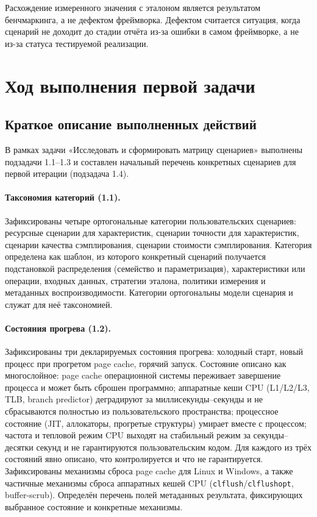 \documentclass[12pt,a4paper]{article}
\begin{document}
Расхождение измеренного значения с эталоном является результатом
бенчмаркинга, а не дефектом фреймворка. Дефектом считается ситуация,
когда сценарий не доходит до стадии отчёта из-за ошибки в самом
фреймворке, а не из-за статуса тестируемой реализации.
\newpage

\section{Ход выполнения первой задачи}
\label{sec:task1}

\subsection{Краткое описание выполненных действий}

В рамках задачи «Исследовать и сформировать матрицу сценариев»
выполнены подзадачи 1.1--1.3 и составлен начальный перечень
конкретных сценариев для первой итерации (подзадача 1.4).

\paragraph{Таксономия категорий (1.1).}
Зафиксированы четыре ортогональные категории пользовательских
сценариев: ресурсные сценарии для характеристик, сценарии
точности для характеристик, сценарии качества сэмплирования,
сценарии стоимости сэмплирования. Категория определена как
шаблон, из которого конкретный сценарий получается подстановкой
распределения (семейство и параметризация), характеристики
или операции, входных данных, стратегии эталона, политики
измерения и метаданных воспроизводимости. Категории ортогональны
модели сценария и служат для неё таксономией.

\paragraph{Состояния прогрева (1.2).}
Зафиксированы три декларируемых состояния прогрева: холодный
старт, новый процесс при прогретом page cache, горячий запуск.
Состояние описано как многослойное: page cache операционной
системы переживает завершение процесса и может быть сброшен
программно; аппаратные кеши CPU (L1/L2/L3, TLB, branch predictor)
деградируют за миллисекунды--секунды и не сбрасываются полностью
из пользовательского пространства; процессное состояние
(JIT, аллокаторы, прогретые структуры) умирает вместе
с процессом; частота и тепловой режим CPU выходят на стабильный
режим за секунды--десятки секунд и не гарантируются
пользовательским кодом. Для каждого из трёх состояний явно
описано, что контролируется и что не гарантируется. Зафиксированы
механизмы сброса page cache для Linux и Windows, а также
частичные механизмы сброса аппаратных кешей CPU
(\texttt{clflush}/\texttt{clflushopt}, buffer-scrub). Определён
перечень полей метаданных результата, фиксирующих выбранное
состояние и конкретные механизмы.
\end{document}
